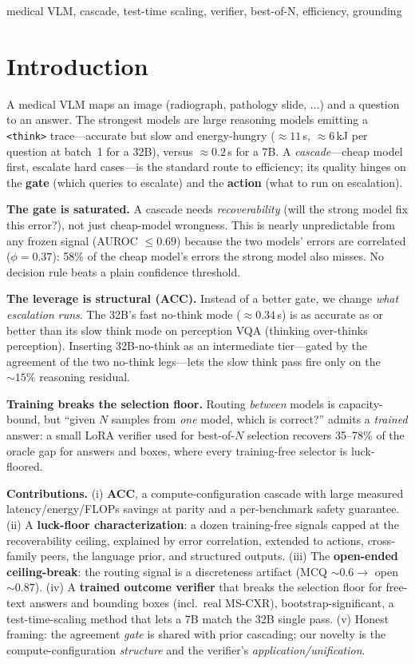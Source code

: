 \documentclass[conference]{IEEEtran}
\begin{document}
\begin{IEEEkeywords}
medical VLM, cascade, test-time scaling, verifier, best-of-N, efficiency, grounding
\end{IEEEkeywords}

\section{Introduction}
A medical VLM maps an image (radiograph, pathology slide, $\ldots$) and a question to an answer. The strongest models are large reasoning models emitting a \texttt{<think>} trace---accurate but slow and energy-hungry (${\approx}11$\,s, ${\approx}6$\,kJ per question at batch~1 for a 32B), versus ${\approx}0.2$\,s for a 7B. A \emph{cascade}---cheap model first, escalate hard cases---is the standard route to efficiency; its quality hinges on the \textbf{gate} (which queries to escalate) and the \textbf{action} (what to run on escalation).

\textbf{The gate is saturated.} A cascade needs \emph{recoverability} (will the strong model fix this error?), not just cheap-model wrongness. This is nearly unpredictable from any frozen signal (AUROC $\le 0.69$) because the two models' errors are correlated ($\phi{=}0.37$): 58\% of the cheap model's errors the strong model also misses. No decision rule beats a plain confidence threshold.

\textbf{The leverage is structural (ACC).} Instead of a better gate, we change \emph{what escalation runs}. The 32B's fast no-think mode (${\approx}0.34$\,s) is as accurate as or better than its slow think mode on perception VQA (thinking over-thinks perception). Inserting 32B-no-think as an intermediate tier---gated by the agreement of the two no-think legs---lets the slow think pass fire only on the ${\sim}15\%$ reasoning residual.

\textbf{Training breaks the selection floor.} Routing \emph{between} models is capacity-bound, but ``given $N$ samples from \emph{one} model, which is correct?'' admits a \emph{trained} answer: a small LoRA verifier used for best-of-$N$ selection recovers 35--78\% of the oracle gap for answers and boxes, where every training-free selector is luck-floored.

\textbf{Contributions.} (i) \textbf{ACC}, a compute-configuration cascade with large measured latency/energy/FLOPs savings at parity and a per-benchmark safety guarantee. (ii) A \textbf{luck-floor characterization}: a dozen training-free signals capped at the recoverability ceiling, explained by error correlation, extended to actions, cross-family peers, the language prior, and structured outputs. (iii) The \textbf{open-ended ceiling-break}: the routing signal is a discreteness artifact (MCQ ${\sim}0.6\to$ open ${\sim}0.87$). (iv) A \textbf{trained outcome verifier} that breaks the selection floor for free-text answers and bounding boxes (incl.\ real MS-CXR), bootstrap-significant, a test-time-scaling method that lets a 7B match the 32B single pass. (v) Honest framing: the agreement \emph{gate} is shared with prior cascading; our novelty is the compute-configuration \emph{structure} and the verifier's \emph{application/unification}.
\end{document}
